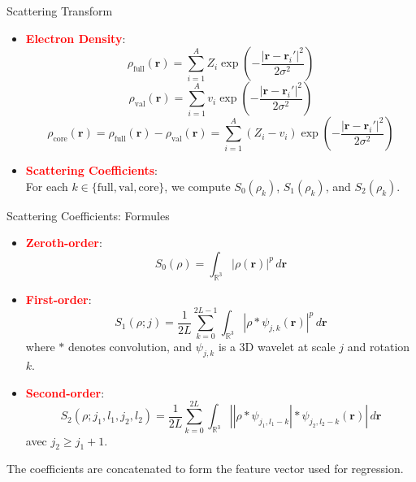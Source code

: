\documentclass[10pt]{beamer}
\begin{document}
\begin{frame}{Scattering Transform}
  \begin{itemize}
    \item \textcolor{red}{\textbf{Electron Density}}:
      \[
      \rho_{\text{full}}(\mathbf{r}) = \sum_{i=1}^A Z_i \exp\left(-\frac{|\mathbf{r} - \mathbf{r}_i'|^2}{2\sigma^2}\right)
      \]
      \[
      \rho_{\text{val}}(\mathbf{r}) = \sum_{i=1}^A v_i \exp\left(-\frac{|\mathbf{r} - \mathbf{r}_i'|^2}{2\sigma^2}\right)
      \]
      \[
      \rho_{\text{core}}(\mathbf{r}) = \rho_{\text{full}}(\mathbf{r}) - \rho_{\text{val}}(\mathbf{r}) = \sum_{i=1}^A (Z_i - v_i) \exp\left(-\frac{|\mathbf{r} - \mathbf{r}_i'|^2}{2\sigma^2}\right)
      \]
    \item \textcolor{red}{\textbf{Scattering Coefficients}}: \\
    \vspace{0.2cm}  
    For each \( k \in \{\text{full}, \text{val}, \text{core}\} \), we compute \( S_0(\rho_k) \), \( S_1(\rho_k) \), and \( S_2(\rho_k) \).
  \end{itemize}
\end{frame}
\begin{frame}{Scattering Coefficients: Formules}
  \begin{itemize}
    \item \textcolor{red}{\textbf{Zeroth-order}}:
      \[
      S_0(\rho) = \int_{\mathbb{R}^3} |\rho(\mathbf{r})|^p\, d\mathbf{r}
      \]
      \vspace{0.2cm}
    \item \textcolor{red}{\textbf{First-order}}:
      \[
      S_1(\rho; j) = \frac{1}{2L} \sum_{k=0}^{2L-1} \int_{\mathbb{R}^3} \left| \rho * \psi_{j,k} (\mathbf{r}) \right|^p\, d\mathbf{r}
      \]
      where \( * \) denotes convolution, and \( \psi_{j,k} \) is a 3D wavelet at scale \( j \) and rotation \( k \).
      \vspace{0.2cm}
    \item \textcolor{red}{\textbf{Second-order}}:
      \[
      S_2(\rho; j_1, l_1, j_2, l_2) =\frac{1}{2L} \sum_{k=0}^{2L} \int_{\mathbb{R}^3} \left| \left| \rho * \psi_{j_1, l_1-k} \right| * \psi_{j_2, l_2-k} (\mathbf{r}) \right|\, d\mathbf{r}
      \]
      avec \( j_2 \geq j_1 + 1 \).
  \end{itemize}
  \vspace{0.2cm}
  {\small
  The coefficients are concatenated to form the feature vector used for regression.
  }
\end{frame}
\end{document}
